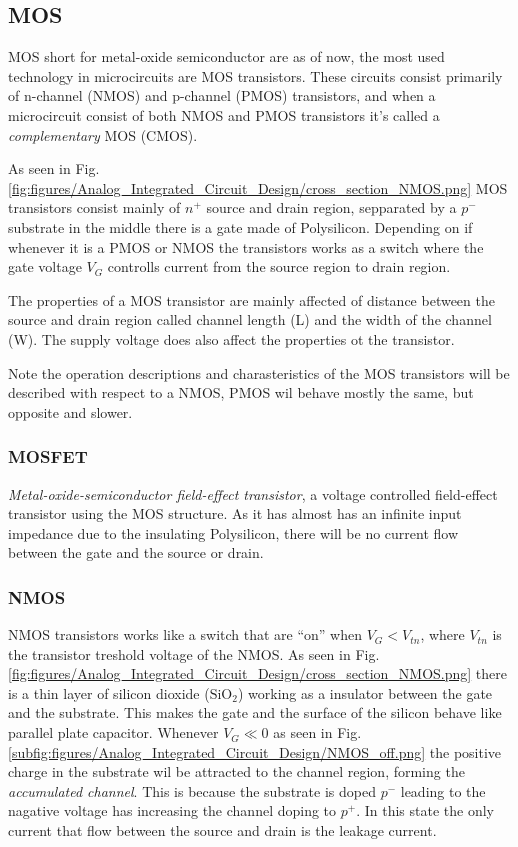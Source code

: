 \subsection{MOS}
MOS short for metal-oxide semiconductor are as of now, the most used technology in microcircuits are MOS transistors. These circuits consist primarily of n-channel (NMOS) and p-channel (PMOS) transistors, and when a microcircuit consist of both NMOS and PMOS transistors it's called a \textit{complementary} MOS (CMOS).\cite[p. 14]{carusone_2012_analog}



As seen in Fig. \ref{fig:figures/Analog_Integrated_Circuit_Design/cross_section_NMOS.png} MOS transistors consist mainly of $n^+$ source and drain region, sepparated by a $p^-$ substrate in the middle there is a gate made of Polysilicon. Depending on if whenever it is a PMOS or NMOS the transistors works as a switch where the gate voltage $V_G$ controlls current from the source region to drain region. 

The properties of a MOS transistor are mainly affected of distance between the source and drain region called channel length (L) and the width of the channel (W). The supply voltage does also affect the properties ot the transistor. 

Note the operation descriptions and charasteristics of the MOS transistors will be described with respect to a NMOS, PMOS wil behave mostly the same, but opposite and slower.

\subsubsection{MOSFET}
\textit{Metal-oxide-semiconductor field-effect transistor}, a voltage controlled field-effect transistor using the MOS structure. As it has almost has an infinite input impedance due to the insulating Polysilicon, there will be no current flow between the gate and the source or drain.


\subsubsection{NMOS}
NMOS transistors works like a switch that are ``on'' when $V_G < V_{tn}$, where $V_{tn}$ is the transistor treshold voltage of the NMOS. As seen in Fig. \ref{fig:figures/Analog_Integrated_Circuit_Design/cross_section_NMOS.png} there is a thin layer of silicon dioxide ($\text{SiO}_2$) working as a insulator between the gate and the substrate. This makes the gate and the surface of the silicon behave like parallel plate capacitor. Whenever $V_G\ll0$ as seen in Fig. \ref{subfig:figures/Analog_Integrated_Circuit_Design/NMOS_off.png} the positive charge in the substrate wil be attracted to the channel region, forming the \textit{accumulated channel}. This is because the substrate is doped $p^-$ leading to the nagative voltage has increasing the channel doping to $p^+$. In this state the only current that flow between the source and drain is the leakage current.

